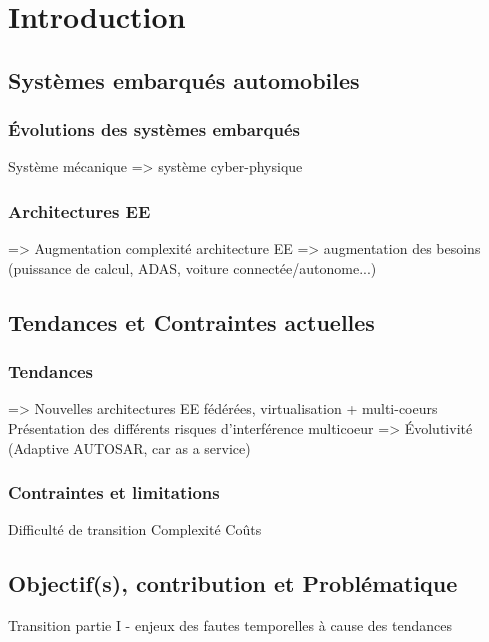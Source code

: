 \documentclass[french, a4paper, 11pt, twoside, pdftex]{StyleThese}
\begin{document}
\fi


\chapter*{Introduction}

\section{Systèmes embarqués automobiles}
    \subsection{Évolutions des systèmes embarqués}
        Système mécanique => système cyber-physique
    \subsection{Architectures EE}
        => Augmentation complexité architecture EE
        => augmentation des besoins (puissance de calcul, ADAS, voiture connectée/autonome...)
\section{Tendances et Contraintes actuelles}
    \subsection{Tendances}
        => Nouvelles architectures EE fédérées, virtualisation + multi-coeurs
            Présentation des différents risques d'interférence multicoeur
        => Évolutivité (Adaptive AUTOSAR, car as a service)
    \subsection{Contraintes et limitations}
        Difficulté de transition
        Complexité
        Coûts
\section{Objectif(s), contribution et Problématique}
    Transition partie I - enjeux des fautes temporelles à cause des tendances

\ifdefined{}
\else


\end{document}
